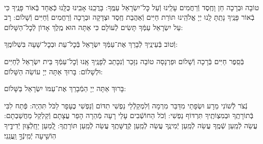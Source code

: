 \documentclass[twoside, openany, parskip=half, 11pt]{book}
\begin{document}
\clearpage

\begin{paracol}{2}
\\
טוֹבָה וּבְרָכָה חֵן וָחֶֽסֶד וְֿרַחֲמִים עָלֵֽינוּ וְֿעַל כׇּל־יִשְׂרָאֵל עַמֶּֽךָ: בָּרֲכֵֽנוּ אָבִֽינוּ כֻּלָּֽנוּ כְּֿאֶחָד בְּֿאוֹר פָּנֶֽיךָ כִּי בְֿאוֹר פָּנֶֽיךָ נָתַֽתָּ לָֽנוּ יְיָ אֱלֹהֵֽינוּ תּוֹרַת חַיִּים וְֿאַהֲבַת חֶֽסֶד וּצְדָקָה וּבְרָכָה וְֿרַחֲמִים וְֿחַיִּים וְֿשָׁלוֹם:
\switchcolumn
{}
רָב עַל יִשְׂרָאֵל עַמְּֿךָ תָּשִׂים לְֿעוֹלָם כִּי אַתָּה הוּא מֶֽלֶךְ אָדוֹן לְֿכׇל־הַשָּׁלוֹם:
\end{paracol}
וְֿטוֹב בְּֿעֵינֶֽיךָ לְֿבָרֵךְ אֶת־עַמְּֿךָ יִשְׂרָאֵל בְּֿכׇל־עֵת וּבְכׇל־שָׁעָה בִּשְׁלוֹמֶֽךָ:


\begin{paracol}{2}
\begin{small}
בְּֿסֵֽפֶר חַיִּים בְּֿרָכָה וְֿשָׁלוֹם וּפַרְנָסָה טוֹבָה נִזָּכֵר וְֿנִכָּתֵב לְֿפָנֶֽיךָ אָֽנוּ וְֿכׇל־עַמְּֿךָ בֵּית יִשְׂרָאֵל לְֿחַיִּים וּלְשָׁלוֹם: בָּרוּךְ אַתָּה יְיָ עוֹשֵׂה הַשָּׁלוֹם:

\end{small}
\switchcolumn
בָּרוּךְ אַתָּה יְיָ הַמְֿבָרֵךְ אֶת־עַמּוֹ יִשְׂרָאֵל בַּשָּׁלוֹם:

\end{paracol}

נְֿצֹר לְֿשׁוֹנִי מֵרָע וּשְׂפָתַי מִדַּבֵּר מִרְמָה וְֿלִמְקַלְֿלַי נַפְשִׁי תִדּוֹם וְֿנַפְשִׁי כֶּעָפָר לַכֹּל תִּהְיֶה: פְּֿתַח לִבִּי בְּֿתוֹרָתֶֽךָ וּבְמִצְוֹתֶֽיךָ תִּרְדּוֹף נַפְשִׁי: וְֿכֹל הַחוֹשְֿׁבִים עָלַי רָעָה מְֿהֵרָה הָפֵר עֲצָתָם וְֿקַלְקֵל מַחֲשַׁבְתָם: עֲשֵׂה לְֿמַֽעַן שְֿׁמֶֽךָ עֲשֵׂה לְֿמַֽעַן יְֿמִינֶֽךָ עֲשֵׂה לְֿמַֽעַן קְֿדֻשָּׁתֶֽךָ עֲשֵׂה לְֿמַֽעַן תּוֹרָתֶֽךָ: לְֿ֭מַעַן יֵחָֽלְֿצ֥וּן יְֿדִידֶ֑יךָ הֽוֹשִׁ֖יעָה יְֿמִֽינְֿךָ֣ וַֽעֲנֵֽנִי׃
\end{document}
